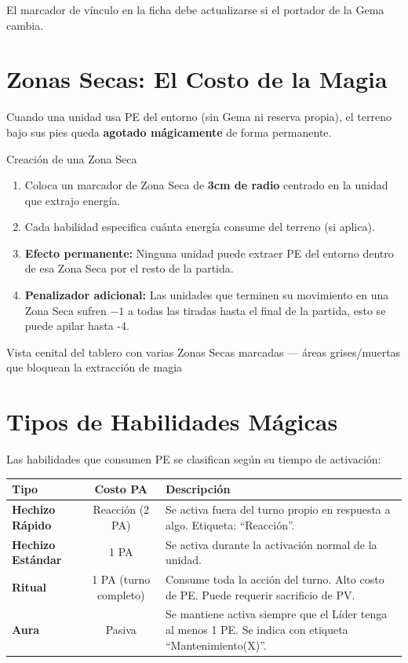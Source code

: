 El marcador de vínculo en la ficha debe actualizarse si el portador de la Gema cambia.

\section{Zonas Secas: El Costo de la Magia}

Cuando una unidad usa PE del entorno (sin Gema ni reserva propia), el terreno bajo sus pies queda \textbf{agotado mágicamente} de forma permanente.

\begin{reglaespecial}{Creación de una Zona Seca}
\begin{enumerate}
    \item Coloca un marcador de Zona Seca de \textbf{3cm de radio} centrado en la unidad que extrajo energía.
    \item Cada habilidad especifica cuánta energía consume del terreno (si aplica).
    \item \textbf{Efecto permanente:} Ninguna unidad puede extraer PE del entorno dentro de esa Zona Seca por el resto de la partida.
    \item \textbf{Penalizador adicional:} Las unidades que terminen su movimiento en una Zona Seca sufren $-1$ a todas las tiradas hasta el final de la partida, esto se puede apilar hasta -4.
\end{enumerate}
\end{reglaespecial}

\begin{imagebox}{Vista cenital del tablero con varias Zonas Secas marcadas — áreas grises/muertas que bloquean la extracción de magia}
    \vspace{2.5cm}
\end{imagebox}

\section{Tipos de Habilidades Mágicas}

Las habilidades que consumen PE se clasifican según su tiempo de activación:

\begin{tabularx}{\linewidth}{|l|c|X|}
\hline
\rowcolor{GoldRule!20} \textbf{Tipo} & \textbf{Costo PA} & \textbf{Descripción} \\ \hline
\textbf{Hechizo Rápido} & Reacción (2 PA) & Se activa fuera del turno propio en respuesta a algo. Etiqueta: ``Reacción''. \\ \hline
\textbf{Hechizo Estándar} & 1 PA & Se activa durante la activación normal de la unidad. \\ \hline
\textbf{Ritual} & 1 PA (turno completo) & Consume toda la acción del turno. Alto costo de PE. Puede requerir sacrificio de PV. \\ \hline
\textbf{Aura} & Pasiva & Se mantiene activa siempre que el Líder tenga al menos 1 PE. Se indica con etiqueta ``Mantenimiento(X)''. \\ \hline
\end{tabularx}

